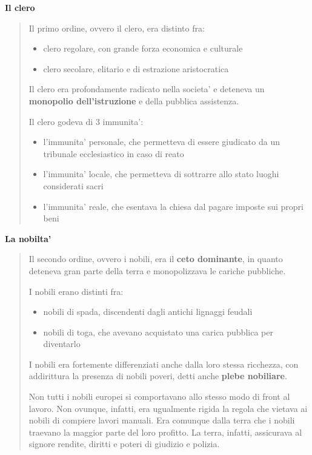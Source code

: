 \documentclass{article}
\begin{document}
{{    \textbf{Il clero}
    \begin{quote}
      Il primo ordine, ovvero il clero, era distinto fra:
      \begin{itemize}
        \item clero regolare, con grande forza economica e culturale
        \item clero secolare, elitario e di estrazione aristocratica
      \end{itemize}
      Il clero era profondamente radicato nella societa' e deteneva un \textbf{monopolio dell'istruzione} e della pubblica assistenza.

      Il clero godeva di 3 immunita':
      \begin{itemize}
        \item l'immunita' personale, che permetteva di essere giudicato da un tribunale ecclesiastico in caso di reato
        \item l'immunita' locale, che permetteva di sottrarre allo stato luoghi considerati sacri
        \item l'immunita' reale, che esentava la chiesa dal pagare imposte sui propri beni
      \end{itemize}
    \end{quote}

    \textbf{La nobilta'}
    \begin{quote}
      Il secondo ordine, ovvero i nobili, era il \textbf{ceto dominante}, in quanto deteneva gran parte della terra e monopolizzava le cariche pubbliche.

      I nobili erano distinti fra:
      \begin{itemize}
        \item nobili di spada, discendenti dagli antichi lignaggi feudali
        \item nobili di toga, che avevano acquistato una carica pubblica per diventarlo
      \end{itemize}

      I nobili era fortemente differenziati anche dalla loro stessa ricchezza, con addirittura la presenza di nobili poveri, detti anche \textbf{plebe nobiliare}.

      Non tutti i nobili europei si comportavano allo stesso modo di front al lavoro. Non ovunque, infatti, era ugualmente rigida la regola che vietava ai nobili di compiere lavori manuali. Era comunque dalla terra che i nobili traevano la maggior parte del loro profitto. La terra, infatti, assicurava al signore rendite, diritti e poteri di giudizio e polizia.
    \end{quote}

}}
\end{document}
